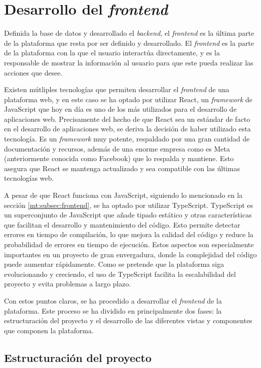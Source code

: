 \section{Desarrollo del \textit{frontend}}
\label{dev:sec:desarrollo_frontend}

Definida la base de datos y desarrollado el \textit{backend}, el \textit{frontend} es la última parte de la plataforma que resta por ser definido y desarrollado. El \textit{frontend} es la parte de la plataforma con la que el usuario interactúa directamente, y es la responsable de mostrar la información al usuario para que este pueda realizar las acciones que desee.

Existen mútliples tecnologías que permiten desarrollar el \textit{frontend} de una plataforma web, y en este caso se ha optado por utilizar React, un \textit{framework} de JavaScript que hoy en día es uno de los más utilizados para el desarrollo de aplicaciones web. Precisamente del hecho de que React sea un estándar de facto en el desarrollo de aplicaciones web, se deriva la decisión de haber utilizado esta tecnología. Es un \textit{framework} muy potente, respaldado por una gran cantidad de documentación y recursos, además de una enorme empresa como es Meta (anteriormente conocida como Facebook) que lo respalda y mantiene. Esto asegura que React se mantenga actualizado y sea compatible con las últimas tecnologías web.

A pesar de que React funciona con JavaScript, siguiendo lo mencionado en la sección \ref{mt:subsec:frontend}, se ha optado por utilizar TypeScript. TypeScript es un superconjunto de JavaScript que añade tipado estático y otras características que facilitan el desarrollo y mantenimiento del código. Esto permite detectar errores en tiempo de compilación, lo que mejora la calidad del código y reduce la probabilidad de errores en tiempo de ejecución. Estos aspectos son especialmente importantes en un proyecto de gran envergadura, donde la complejidad del código puede aumentar rápidamente. Como se pretende que la plataforma siga evolucionando y creciendo, el uso de TypeScript facilita la escalabilidad del proyecto y evita problemas a largo plazo.

Con estos puntos claros, se ha procedido a desarrollar el \textit{frontend} de la plataforma. Este proceso se ha dividido en principalmente dos fases: la estructuración del proyecto y el desarrollo de las diferentes vistas y componentes que componen la plataforma.

\subsection{Estructuración del proyecto}
\label{dev:subsec:estructuracion_proyecto}

